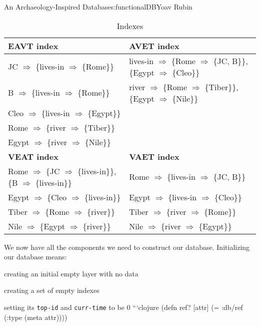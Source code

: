 \begin{aosachapter}{An Archaeology-Inspired Database}{s:functionalDB}{Yoav Rubin}
\begin{table}
\centering
{\footnotesize
{}
\begin{tabular}{ll}
\hline
\textbf{EAVT index}
& \textbf{AVET index}
\\
\hline
JC $\Rightarrow$ \{lives-in $\Rightarrow$ \{Rome\}\} & lives-in $\Rightarrow$ \{Rome $\Rightarrow$ \{JC, B\}\}, \{Egypt $\Rightarrow$ \{Cleo\}\} \\
B $\Rightarrow$ \{lives-in $\Rightarrow$ \{Rome\}\}  & river $\Rightarrow$ \{Rome $\Rightarrow$ \{Tiber\}\}, \{Egypt $\Rightarrow$ \{Nile\}\} \\
Cleo $\Rightarrow$ \{lives-in $\Rightarrow$ \{Egypt\}\} & \\ 
Rome $\Rightarrow$ \{river $\Rightarrow$ \{Tiber\}\}  & \\ 
Egypt $\Rightarrow$ \{river $\Rightarrow$ \{Nile\}\}  & \\
\hline
\textbf{VEAT index}
& \textbf{VAET index}
\\
\hline
Rome $\Rightarrow$ \{JC $\Rightarrow$ \{lives-in\}\}, \{B $\Rightarrow$ \{lives-in\}\} & Rome $\Rightarrow$ \{lives-in $\Rightarrow$ \{JC, B\}\} \\
Egypt $\Rightarrow$ \{Cleo $\Rightarrow$ \{lives-in\}\}                                & Egypt $\Rightarrow$ \{lives-in $\Rightarrow$ \{Cleo\}\} \\ 
Tiber $\Rightarrow$ \{Rome $\Rightarrow$ \{river\}\}                                   & Tiber $\Rightarrow$ \{river $\Rightarrow$ \{Rome\}\} \\
Nile $\Rightarrow$ \{Egypt $\Rightarrow$ \{river\}\}                                   & Nile $\Rightarrow$ \{river $\Rightarrow$ \{Egypt\}\} \\
\hline
\end{tabular}
}
\caption{Indexes}
\label{500l.functionaldb.indextable}
\end{table}

\label{database}

We now have all the components we need to construct our database.
Initializing our database means:

\begin{aosaitemize}

\item
  creating an initial empty layer with no data
\item
  creating a set of empty indexes
\item
  setting its \texttt{top-id} and \texttt{curr-time} to be 0 ```clojure
  (defn ref? {[}attr{]} (= :db/ref (:type (meta attr))))
\end{aosaitemize}


\end{aosachapter}
